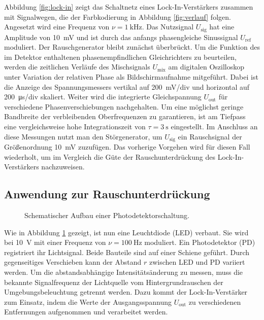 Abbildung \ref{fig:lock-in} zeigt das Schaltnetz eines Lock-In\hspace{0.1ex}-\hspace{-0.25ex}Verstärkers
zusammen mit Signalwegen, die der Farbkodierung in Abbildung \ref{fig:verlauf} folgen. Angesetzt wird eine
Frequenz von $\nu = \qty{1}{\kilo\hertz}$. Das Nutzsignal $U_{\! \text{sig}}$ hat eine Amplitude von
\qty{10}{\milli\volt} und ist durch das anfangs phasengleiche Sinussignal $U_{\! \text{ref}}$ moduliert. Der
Rauschgenerator bleibt zunächst überbrückt. Um die Funktion des im Detektor enthaltenen phasenempfindlichen
Gleichrichters zu beurteilen, werden die zeitlichen Verläufe des Mischsignals $U_{\! \text{mix}}$ am digitalen
Oszilloskop unter Variation der relativen Phase als Bildschirmaufnahme mitgeführt. Dabei ist die Anzeige des
Spannungsmessers vertikal auf \qty{200}{\milli\volt}$\!$/div und horizontal auf \qty{200}{\micro\second}/div
skaliert. Weiter wird die integrierte Gleichspannung $U_{\! \text{out}}$ für verschiedene Phasenverschiebungen
nachgehalten. Um eine möglichst geringe Bandbreite der verbleibenden Oberfrequenzen zu garantieren, ist am
Tiefpass eine vergleichsweise hohe Integrationszeit von $\tau = \qty{3}{\second}$ eingestellt. Im Anschluss
an diese Messungen nutzt man den Störgenerator, um $U_{\! \text{sig}}$ ein Rauschsignal der Größenordnung
\qty{10}{\milli\volt} zuzufügen. Das vorherige Vorgehen wird für diesen Fall wiederholt, um im Vergleich die
Güte der Rauschunterdrückung des Lock-In\hspace{0.1ex}-\hspace{-0.25ex}Verstärkers nachzuweisen.

\subsection{Anwendung zur Rauschunterdrückung}

\begin{figure}[H]
	\centering
	\begin{tikzpicture}
		
	\end{tikzpicture}
	\vspace{1.23ex}
	\caption{Schematischer Aufbau einer Photodetektorschaltung.}
	\label{fig:photo}
\end{figure}

Wie in Abbildung \ref{fig:photo} gezeigt, ist nun eine Leuchtdiode (LED) verbaut. Sie wird bei
\qty{10}{\volt} mit einer Frequenz von $\nu = \qty{100}{\hertz}$ moduliert. Ein Photodetektor (PD) registriert
ihr Lichtsignal. Beide Bauteile sind auf einer Schiene geführt. Durch gegenseitiges Verschieben kann
der Abstand $r$ zwischen LED und PD variiert werden. Um die abstandsabhängige Intensitätsänderung
zu messen, muss die bekannte Signalfrequenz der Lichtquelle vom Hintergrundrauschen der Umgebungsbeleuchtung
getrennt werden. Dazu kommt der Lock-In\hspace{0.1ex}-\hspace{-0.25ex}Verstärker zum Einsatz, indem die Werte
der Ausgangsspannung $U_{\! \text{out}}$ zu verschiedenen Entfernungen aufgenommen und verarbeitet werden.
